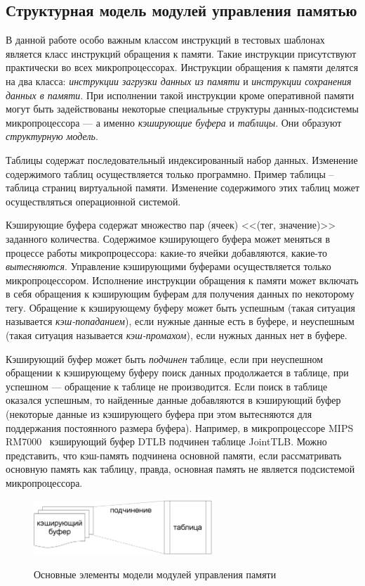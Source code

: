 \subsection{Структурная модель модулей управления памятью}

В данной работе особо важным классом инструкций в тестовых шаблонах
является класс инструкций обращения к памяти. Такие инструкции
присутствуют практически во всех микропроцессорах. Инструкции
обращения к памяти делятся на два класса: \emph{инструкции загрузки
данных из памяти} и \emph{инструкции сохранения данных в памяти}.
При исполнении такой инструкции кроме оперативной памяти могут быть
задействованы некоторые специальные структуры данных-подсистемы
микропроцессора --- а именно \emph{кэширующие буфера} и
\emph{таблицы}. Они образуют \emph{структурную модель}.

Таблицы содержат последовательный индексированный набор данных.
Изменение содержимого таблиц осуществляется только программно.
Пример таблицы -- таблица страниц виртуальной памяти. Изменение
содержимого этих таблиц может осуществляться операционной системой.

Кэширующие буфера содержат множество пар (ячеек) <<(тег, значение)>>
заданного количества. Содержимое кэширующего буфера может меняться в
процессе работы микропроцессора: какие-то ячейки добавляются,
какие-то \emph{вытесняются}. Управление кэширующими буферами
осуществляется только микропроцессором. Исполнение инструкции
обращения к памяти может включать в себя обращения к кэширующим
буферам для получения данных по некоторому тегу. Обращение к
кэширующему буферу может быть успешным (такая ситуация называется
\emph{кэш-попаданием}), если нужные данные есть в буфере, и
неуспешным (такая ситуация называется \emph{кэш-промахом}), если
нужных данных нет в буфере.

Кэширующий буфер может быть \emph{подчинен} таблице, если при
неуспешном обращении к кэширующему буферу поиск данных продолжается
в таблице, при успешном --- обращение к таблице не производится.
Если поиск в таблице оказался успешным, то найденные данные
добавляются в кэширующий буфер (некоторые данные из кэширующего
буфера при этом вытесняются для поддержания постоянного размера
буфера). Например, в микропроцессоре MIPS RM7000~\cite{mips64_III}
кэширующий буфер DTLB подчинен таблице JointTLB. Можно представить,
что кэш-память подчинена основной памяти, если рассматривать
основную память как таблицу, правда, основная память не является
подсистемой микропроцессора.

\begin{figure}[h] \center
  \includegraphics[width=0.6\textwidth]{2.theor/elements}\\
  \caption{Основные элементы модели модулей управления памяти}
\end{figure}

